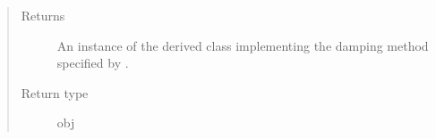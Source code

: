 \documentclass[letterpaper,10pt,english]{sphinxmanual}
\begin{document}
\begin{fulllineitems}
\begin{fulllineitems}
\begin{quote}
\begin{description}
\begin{itemize}
\end{itemize}

\item[{Returns}] \leavevmode
An instance of the derived class implementing the damping method specified by .

\item[{Return type}] \leavevmode
obj

\end{description}\end{quote}

\end{fulllineitems}


\end{fulllineitems}

\end{document}
